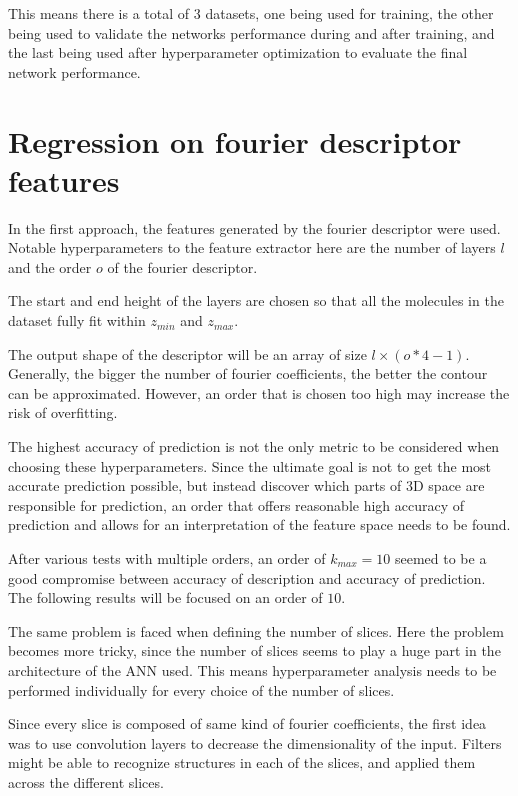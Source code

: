 This means there is a total of 3 datasets, one being used for training, the other being used to validate the networks
performance during and after training, and the last being used after hyperparameter optimization to evaluate the final network
performance.

\section{Regression on fourier descriptor features}
\label{sec:Evaluation:fourier}

In the first approach, the features generated by the fourier descriptor were used.
Notable hyperparameters to the feature extractor here are the number of layers $l$ and the order $o$ of the fourier descriptor.

The start and end height of the layers are chosen so that all the molecules in the dataset fully fit within $z_{min}$ and $z_{max}$.

The output shape of the descriptor will be an array of size $l \times (o * 4 - 1)$.
Generally, the bigger the number of fourier coefficients, the better the contour can be approximated.
However, an order that is chosen too high may increase the risk of overfitting.

The highest accuracy of prediction is not the only metric to be considered when choosing these hyperparameters.
Since the ultimate goal is not to get the most accurate prediction possible, but instead discover which parts of 3D space 
are responsible for prediction, an order that offers reasonable high accuracy of prediction and 
allows for an interpretation of the feature space needs to be found.

After various tests with multiple orders, an order of $k_{max} = 10$ seemed to be a good compromise between accuracy of description and accuracy of prediction.
The following results will be focused on an order of $10$.

The same problem is faced when defining the number of slices.
Here the problem becomes more tricky, since the number of slices seems to play a huge part in the architecture of the ANN used.
This means hyperparameter analysis needs to be performed individually for every choice of the number of slices.

Since every slice is composed of same kind of fourier coefficients, the first idea was to use convolution layers to decrease the dimensionality of the input.
Filters might be able to recognize structures in each of the slices, and applied them across the different slices.


